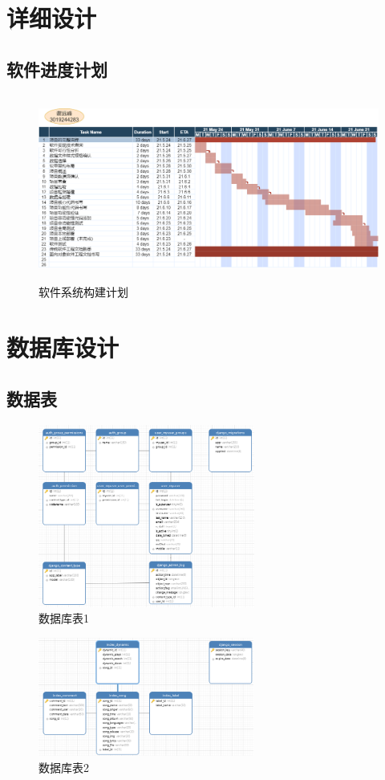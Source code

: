 \documentclass[UTF8,14pt]{article}
\numberwithin{figure}{subsubsection}
\numberwithin{table}{subsubsection}
\begin{document}
\section{详细设计}
\subsection{软件进度计划}
\begin{figure}[H]
	\centering
	\includegraphics[width=13.06cm,height=6.12cm]{figures/software.png}
	\caption{软件系统构建计划}
\end{figure}

\clearpage
\section{数据库设计}
\subsection{数据表}
\begin{minipage}[t]{0.58\linewidth}
	\begin{figure}[H]
		\includegraphics[width=7.12cm,height=6.01cm]{figures/ER1.png}
		\caption{数据库表1}
	\end{figure}
\end{minipage}
\begin{minipage}[t]{0.4\linewidth}
	\begin{figure}[H]
		\centering
		\includegraphics[width=7.10cm,height=3.90cm]{figures/ER2.png}
		\caption{数据库表2}
	\end{figure}
\end{minipage}
\end{document}
